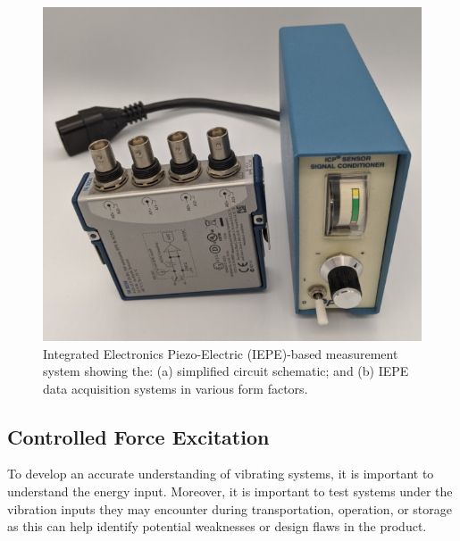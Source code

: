 \documentclass[12pt,letter]{article}
\begin{document}
\begin{figure}[H]
    \centering
    \includegraphics[width=6.5in]{../figures/IEPE.png}
    \caption{Integrated Electronics Piezo-Electric (IEPE)-based measurement system showing the: (a) simplified circuit schematic\protect\footnotemark[1]; and (b) IEPE data acquisition systems in various form factors.}
    \label{fig:IEPE}
\end{figure} 








\subsection{Controlled Force Excitation}

To develop an accurate understanding of vibrating systems, it is important to understand the energy input. Moreover, it is important to test systems under the vibration inputs they may encounter during transportation, operation, or storage as this can help identify potential weaknesses or design flaws in the product.
\end{document}
